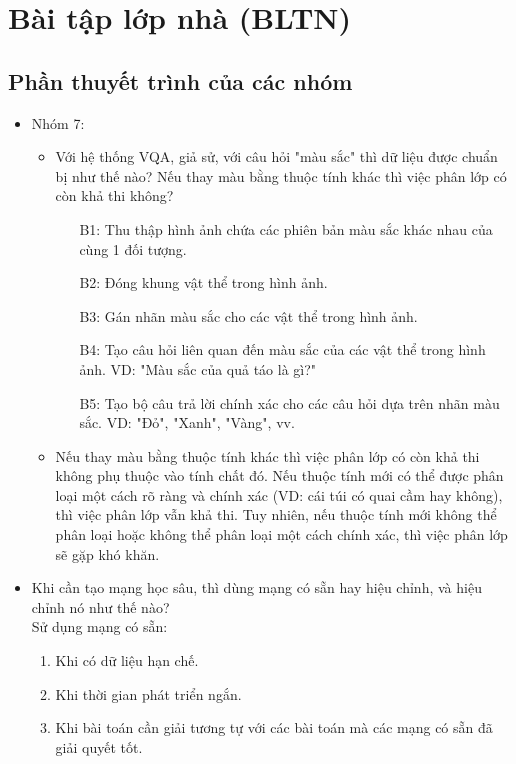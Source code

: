 \section{Bài tập lớp nhà (BLTN)}
\subsection{Phần thuyết trình của các nhóm}
\begin{itemize}
    \item Nhóm 7:
    \begin{itemize}
        \item Với hệ thống VQA, giả sử, với câu hỏi "màu sắc" thì dữ liệu được chuẩn bị như thế nào? Nếu thay màu bằng thuộc tính khác thì việc phân lớp có còn khả thi không?
        \begin{enumerate}
            \item[B1:] Thu thập hình ảnh chứa các phiên bản màu sắc khác nhau của cùng 1 đối tượng.            
            \item[B2:] Đóng khung vật thể trong hình ảnh.
            \item[B3:] Gán nhãn màu sắc cho các vật thể trong hình ảnh.
            \item[B4:] Tạo câu hỏi liên quan đến màu sắc của các vật thể trong hình ảnh. VD: "Màu sắc của quả táo là gì?"
            \item[B5:] Tạo bộ câu trả lời chính xác cho các câu hỏi dựa trên nhãn màu sắc. VD: "Đỏ", "Xanh", "Vàng", vv.             
        \end{enumerate}
        \item Nếu thay màu bằng thuộc tính khác thì việc phân lớp có còn khả thi không phụ thuộc vào tính chất đó. Nếu thuộc tính mới có thể được phân loại một cách rõ ràng và chính xác (VD: cái túi có quai cầm hay không), thì việc phân lớp vẫn khả thi. Tuy nhiên, nếu thuộc tính mới không thể phân loại hoặc không thể phân loại một cách chính xác, thì việc phân lớp sẽ gặp khó khăn.
    \end{itemize}
    \item Khi cần tạo mạng học sâu, thì dùng mạng có sẵn hay hiệu chỉnh, và hiệu chỉnh nó như thế nào?\\
    Sử dụng mạng có sẵn:
    \begin{enumerate}
        \item Khi có dữ liệu hạn chế.
        \item Khi thời gian phát triển ngắn.
        \item Khi bài toán cần giải tương tự với các bài toán mà các mạng có sẵn đã giải quyết tốt.

\end{enumerate}
\end{itemize}
